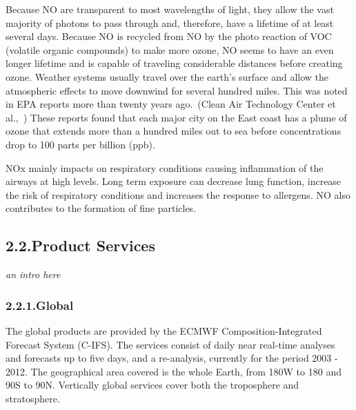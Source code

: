 \documentclass[9pt]{article}
\begin{document}
Because NO are transparent to most wavelengths of light, they allow the vast majority of photons to pass through and, therefore, have a lifetime of at least several days. 
Because NO is  recycled from NO by the photo reaction of VOC (volatile organic compounds) to make more ozone, NO seems to have an even longer lifetime and is capable of traveling considerable distances before creating ozone.  Weather systems usually travel over the earth’s surface and allow the atmospheric effects to move downwind for several hundred miles.
This was noted in EPA reports more than twenty years ago.~(Clean Air Technology Center et al.,~)
These reports found that each major city on the East coast has a plume of ozone that extends more than a hundred miles out to sea before concentrations drop to 100 parts per billion (ppb).%

NOx mainly impacts on respiratory conditions causing inflammation of the airways at high levels. Long term exposure can decrease lung function, increase the risk of respiratory conditions and increases the response to allergens. 
NO also contributes to the formation of fine particles.%

\subsection{2.2.\hspace*{0.5em}Product Services}\label{sec-product-services}%

\noindent{}\emph{an intro here}%

\subsubsection{2.2.1.\hspace*{0.5em}Global}\label{sec-global}%

\noindent{}The global products are provided by the ECMWF Composition-Integrated Forecast System (C-IFS).
The services consist of daily near real-time analyses and forecasts up to five days, and a re-analysis, currently for the period 2003 - 2012. 
The geographical area covered is the whole Earth, from 180\textdegree{}W to 180\textdegree{} and 90\textdegree{}S to 90\textdegree{}N. 
Vertically global services cover both the troposphere and stratosphere.%
\end{document}
